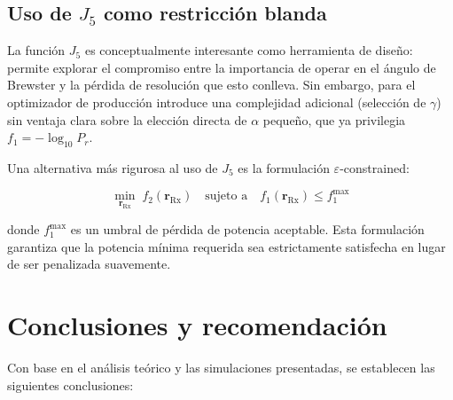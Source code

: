 \documentclass[11pt, a4paper]{article}
\newcommand{\Rx}{\mathrm{Rx}}
\newcommand{\rRx}{\mathbf{r}_{\Rx}}
\begin{document}
\subsection{Uso de \texorpdfstring{$J_5$}{J5} como restricción blanda}

La función $J_5$ es conceptualmente interesante como herramienta de diseño: permite
explorar el compromiso entre la importancia de operar en el ángulo de Brewster y la
pérdida de resolución que esto conlleva. Sin embargo, para el optimizador de producción
introduce una complejidad adicional (selección de $\gamma$) sin ventaja clara sobre la
elección directa de $\alpha$ pequeño, que ya privilegia $f_1 = -\log_{10}P_r$.

Una alternativa más rigurosa al uso de $J_5$ es la formulación $\varepsilon$-constrained:

\begin{equation}
  \min_{\rRx} \; f_2(\rRx) \quad
  \text{sujeto a} \quad f_1(\rRx) \leq f_1^{\max}
  \label{eq:eps_constrained}
\end{equation}

donde $f_1^{\max}$ es un umbral de pérdida de potencia aceptable. Esta formulación
garantiza que la potencia mínima requerida sea estrictamente satisfecha en lugar de
ser penalizada suavemente.

\section{Conclusiones y recomendación}

Con base en el análisis teórico y las simulaciones presentadas, se establecen las
siguientes conclusiones:
\end{document}
